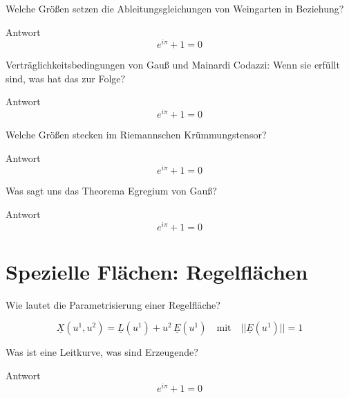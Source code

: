 \documentclass[twocolumn, fontsize=8pt, DIV=1]{scrartcl}
\begin{document}
\begin{framed}
    Welche Größen setzen die Ableitungsgleichungen von Weingarten in Beziehung?
\end{framed}
Antwort
\[
    e^{i\pi} + 1 = 0
\]



\begin{framed}
    Verträglichkeitsbedingungen von Gauß und Mainardi Codazzi: Wenn sie erfüllt sind, was hat das zur Folge?
\end{framed}
Antwort
\[
    e^{i\pi} + 1 = 0
\]



\begin{framed}
    Welche Größen stecken im Riemannschen Krümmungstensor?
\end{framed}
Antwort
\[
    e^{i\pi} + 1 = 0
\]



\begin{framed}
    Was sagt uns das Theorema Egregium von Gauß?
\end{framed}
Antwort
\[
    e^{i\pi} + 1 = 0
\]











\section{Spezielle Flächen: Regelflächen}



\begin{framed}
    Wie lautet die Parametrisierung einer Regelfläche?
\end{framed}
\[
    \underline{X}(u^1, u^2) = \underline{L}(u^1) + u^2\, \underline{E}(u^1)
    \quad \text{mit} \quad ||\underline{E}(u^1)|| = 1
\]



\begin{framed}
    Was ist eine Leitkurve, was sind Erzeugende?
\end{framed}
Antwort
\[
    e^{i\pi} + 1 = 0
\]
\end{document}
